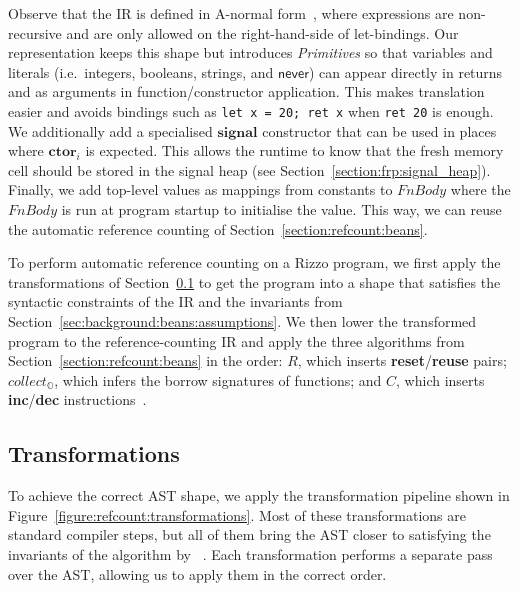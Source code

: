 Observe that the IR is defined in A-normal form~\cite{flanagan_essence_1993}, where expressions are non-recursive and are only allowed on the right-hand-side of let-bindings. 
Our representation keeps this shape but introduces \textit{Primitives} so that variables and literals (i.e.~integers, booleans, strings, and $\mathsf{never}$) can appear directly in returns and as arguments in function/constructor application. This makes translation easier and avoids bindings such as \lstinline|let x = 20; ret x| when \lstinline|ret 20| is enough.
We additionally add a specialised $\mathbf{signal}$ constructor that can be used in places where $\mathbf{ctor}_i$ is expected. 
This allows the runtime to know that the fresh memory cell should be stored in the signal heap (see Section~\ref{section:frp:signal_heap}). 
Finally, we add top-level values as mappings from constants to $FnBody$ where the $FnBody$ is run at program startup to initialise the value. This way, we can reuse the automatic reference counting of Section~\ref{section:refcount:beans}.

To perform automatic reference counting on a Rizzo program, 
we first apply the transformations of Section~\ref{section:refcount:transforms} to get the program into a shape that satisfies the syntactic constraints of the IR and the invariants from Section~\ref{sec:background:beans:assumptions}. 
We then lower the transformed program to the reference-counting IR and apply the three algorithms from Section~\ref{section:refcount:beans} in the order:
  $R$, which inserts \textbf{reset}/\textbf{reuse} pairs; 
  $collect_{\mathbb{O}}$, which infers the borrow signatures of functions; 
  and $C$, which inserts \textbf{inc}/\textbf{dec} instructions~\cite{ullrich_counting_2021}.

\subsection{Transformations}\label{section:refcount:transforms}
To achieve the correct AST shape, we apply the transformation pipeline shown in Figure~\ref{figure:refcount:transformations}. Most of these transformations are standard compiler steps, but all of them bring the AST closer to satisfying the invariants of the algorithm by \citeauthor*{ullrich_counting_2021}~\cite{ullrich_counting_2021}. Each transformation performs a separate pass over the AST, allowing us to apply them in the correct order.

